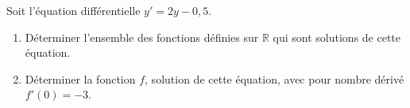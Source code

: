 \medskip

Soit l'équation différentielle $y' = 2y - 0,5$.

\begin{enumerate}
    \item Déterminer l'ensemble des fonctions définies sur $\mathbb{R}$ qui sont solutions de cette équation.
    \item Déterminer la fonction $f$, solution de cette équation, avec pour nombre dérivé \mbox{$f'(0) = -3$}.
\end{enumerate}

\bigskip
